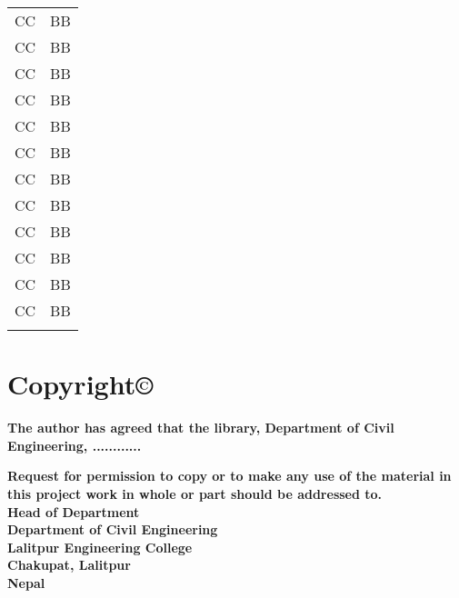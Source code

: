 \documentclass{book}
\begin{document}
\begin{table}[]
    \begin{tabular}{p{4cm} p{5cm}}
         CC&BB  \\
         CC&BB  \\
         CC&BB  \\
         CC&BB  \\
         CC&BB  \\
         CC&BB  \\
         CC&BB  \\
         CC&BB  \\
         CC&BB  \\
         CC&BB  \\
         CC&BB  \\
         CC&BB  \\
         & 
    \end{tabular}
\end{table}
\chapter*{Copyright\copyright}
\textbf{
The author has agreed that the library, Department of Civil Engineering, ............\\
}

\textbf{
Request for permission to copy or to make any use of the material in this project work in whole or part should be addressed to.\\
\vspace{1in}
Head of Department\\
Department of Civil Engineering\\
Lalitpur Engineering College\\
Chakupat, Lalitpur\\
Nepal}
\end{document}
